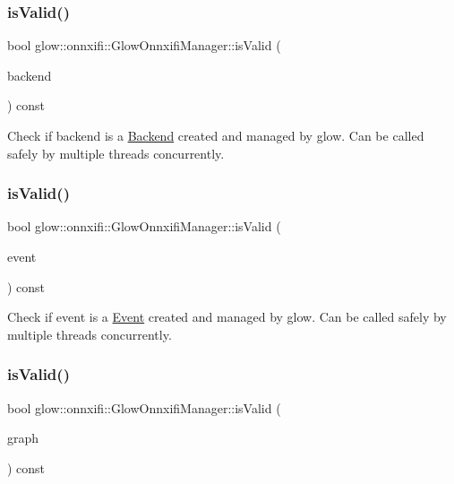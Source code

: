 \subsubsection{\texorpdfstring{is\+Valid()}{isValid()}\hspace{0.1cm}{\footnotesize\ttfamily [1/3]}}
{\footnotesize\ttfamily bool glow\+::onnxifi\+::\+Glow\+Onnxifi\+Manager\+::is\+Valid (\begin{DoxyParamCaption}\item[{\hyperlink{classglow_1_1onnxifi_1_1_backend}{Backend\+Ptr}}]{backend }\end{DoxyParamCaption}) const}

Check if {\ttfamily backend} is a \hyperlink{classglow_1_1onnxifi_1_1_backend}{Backend} created and managed by glow. Can be called safely by multiple threads concurrently. \mbox{\label{classglow_1_1onnxifi_1_1_glow_onnxifi_manager_ac8ad36eb469b6139f260ff6d3c40565f}} 
\subsubsection{\texorpdfstring{is\+Valid()}{isValid()}\hspace{0.1cm}{\footnotesize\ttfamily [2/3]}}
{\footnotesize\ttfamily bool glow\+::onnxifi\+::\+Glow\+Onnxifi\+Manager\+::is\+Valid (\begin{DoxyParamCaption}\item[{\hyperlink{classglow_1_1onnxifi_1_1_event}{Event\+Ptr}}]{event }\end{DoxyParamCaption}) const}

Check if {\ttfamily event} is a \hyperlink{classglow_1_1onnxifi_1_1_event}{Event} created and managed by glow. Can be called safely by multiple threads concurrently. \mbox{\label{classglow_1_1onnxifi_1_1_glow_onnxifi_manager_aa472c562f8a41fcd701c0fc201ee9ff4}} 
\subsubsection{\texorpdfstring{is\+Valid()}{isValid()}\hspace{0.1cm}{\footnotesize\ttfamily [3/3]}}
{\footnotesize\ttfamily bool glow\+::onnxifi\+::\+Glow\+Onnxifi\+Manager\+::is\+Valid (\begin{DoxyParamCaption}\item[{\hyperlink{classglow_1_1onnxifi_1_1_graph}{Graph\+Ptr}}]{graph }\end{DoxyParamCaption}) const}

